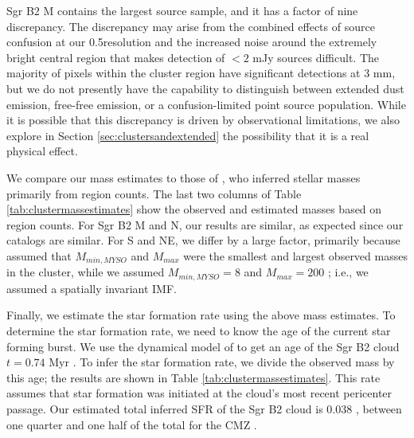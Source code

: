 \documentclass[twocolumn]{aastex61}
\begin{document}
Sgr B2 M contains the largest source sample, and it has a factor of nine
discrepancy. The discrepancy may arise from the combined effects of source
confusion at our 0.5\arcsec resolution and the increased noise around the
extremely bright central region that makes detection of $<2$ mJy sources
difficult.  The majority of pixels within the cluster region have significant
detections at 3 mm, but we do not presently have the capability to distinguish
between extended dust emission, free-free emission, or a confusion-limited
point source population.  While it is possible that this discrepancy
is driven by observational limitations, we also explore in Section
\ref{sec:clustersandextended} the possibility that it is a real physical
effect.

We compare our mass estimates to those of \citet{Schmiedeke2016a}, who inferred
stellar masses primarily from \hii region counts.  The last two columns of Table
\ref{tab:clustermassestimates} show the observed and estimated masses based on
\hii region counts.  For Sgr B2 M and N, our results are similar, as expected
since our catalogs are similar.  For S and NE, we differ by a large factor,
primarily because \citet{Schmiedeke2016a} assumed that $M_{min,MYSO}$ and $M_{max}$
were the smallest and largest observed masses in the cluster, while we assumed
$M_{min,MYSO}=8$ \msun and $M_{max}=200$ \msun; i.e., we assumed a spatially
invariant IMF.



Finally, we estimate the star formation rate using the above mass estimates.
To determine the star formation rate, we need to know the age of the current
star forming burst.  We use the dynamical model of \citet{Kruijssen2015a} to
get an age of the Sgr B2 cloud $t=0.74$ Myr \citep{Longmore2013a}.  To infer
the star formation rate, we divide the observed mass by this age; the results
are shown in Table \ref{tab:clustermassestimates}.  This rate assumes that star
formation was initiated at the cloud's most recent pericenter passage.  Our
estimated total inferred SFR of the Sgr B2 cloud is 0.038 \msun \peryr, between
one quarter and one half of the total for the CMZ
\citep{Longmore2013a,Barnes2017b}.


% 
\end{document}
